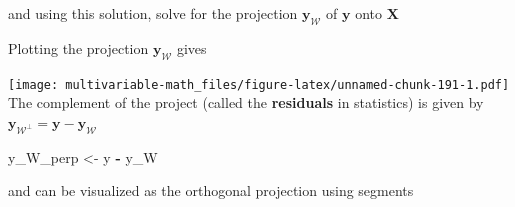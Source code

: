 \documentclass[
]{book}
\newenvironment{Shaded}{\begin{snugshade}}{\end{snugshade}}
\newcommand{\CommentTok}[1]{\textcolor[rgb]{0.56,0.35,0.01}{\textit{#1}}}
\newcommand{\DataTypeTok}[1]{\textcolor[rgb]{0.13,0.29,0.53}{#1}}
\newcommand{\DecValTok}[1]{\textcolor[rgb]{0.00,0.00,0.81}{#1}}
\newcommand{\KeywordTok}[1]{\textcolor[rgb]{0.13,0.29,0.53}{\textbf{#1}}}
\newcommand{\NormalTok}[1]{#1}
\newcommand{\OperatorTok}[1]{\textcolor[rgb]{0.81,0.36,0.00}{\textbf{#1}}}
\newcommand{\StringTok}[1]{\textcolor[rgb]{0.31,0.60,0.02}{#1}}
\theoremstyle{definition}
\theoremstyle{definition}
\theoremstyle{definition}
\theoremstyle{definition}
\theoremstyle{remark}
\begin{document}
and using this solution, solve for the projection \(\mathbf{y}_{\mathcal{W}}\) of \(\mathbf{y}\) onto \(\mathbf{X}\)

\begin{Shaded}
\end{Shaded}

Plotting the projection \(\mathbf{y}_{\mathcal{W}}\) gives

\begin{Shaded}
\end{Shaded}

\texttt{[image: multivariable-math\_files/figure-latex/unnamed-chunk-191-1.pdf]}
The complement of the project (called the \textbf{residuals} in statistics) is given by \(\mathbf{y}_{\mathcal{W}^\perp} = \mathbf{y} - \mathbf{y}_{\mathcal{W}}\)

\begin{Shaded}
\begin{Highlighting}[]
\NormalTok{y_W_perp <-}\StringTok{ }\NormalTok{y }\OperatorTok{-}\StringTok{ }\NormalTok{y_W}
\end{Highlighting}
\end{Shaded}

and can be visualized as the orthogonal projection using segments
\end{document}
